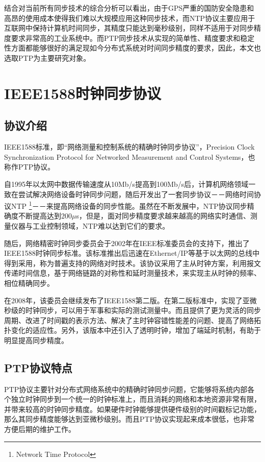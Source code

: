 结合对当前所有同步技术的综合分析可以看出，由于GPS严重的国防安全隐患和高昂的使用成本使得我们难以大规模应用这种同步技术，而NTP协议主要应用于互联网中保持计算机时间同步，其精度只能达到毫秒级别，同样不适用于对同步精度要求非常高的工业系统中。而PTP同步技术从实现的简单性、精度要求和稳定性方面都能够很好的满足现如今分布式系统对时间同步精度的要求，因此，本文也选取PTP为主要研究对象。


\section{IEEE1588时钟同步协议}

\subsection{协议介绍}
\label{sec:1588_intro}
IEEE1588标准，即“网络测量和控制系统的精确时钟同步协议”，Precision Clock Synchronization Protocol for Networked Measurement and Control Systems，也称作PTP协议。

自1995年以太网中数据传输速度从10Mb/s提高到100Mb/s后，计算机网络领域一致在尝试解决网络设备时钟同步问题，随后开发出了一套同步协议－－网络时间协议NTP \footnote{Network Time Protocol}－－来提高网络设备的同步性能。虽然在不断发展中，NTP协议同步精确度不断提高达到200$\mu$s，但是，面对同步精度要求越来越高的网络实时通信、测量仪器与工业控制领域，NTP难以达到它们的要求。

随后，网络精密时钟同步委员会于2002年在IEEE标准委员会的支持下，推出了IEEE1588时钟同步标准。该标准推出后迅速在Ethernet/IP等基于以太网的总线中得到采用，称为普遍支持的网络对时技术。该协议采用了主从时钟方案，利用报文传递时间信息，基于网络链路的对称性和延时测量技术，来实现主从时钟的频率、相位精确同步。

在2008年，该委员会继续发布了IEEE1588第二版。在第二版标准中，实现了亚微秒级的时钟同步，可以用于军事和实际的测试测量中。而且提供了更为灵活的同步周期、改进了时间戳的表示方法、解决了主时钟容错性能差的问题、提高了网络拓扑变化的适应性。另外，该版本中还引入了透明时钟，增加了端延时机制，有助于明显提高同步精度。

\subsection{PTP协议特点}
\label{sec:1588_features}
PTP协议主要针对分布式网络系统中的精确时钟同步问题，它能够将系统内部各个独立时钟同步到一个统一的时钟标准上，而且消耗的网络和本地资源非常有限，并带来较高的时钟同步精度。如果硬件时钟能够提供硬件级别的时间戳标记功能，那么其同步精度能够达到亚微秒级别。而且PTP协议实现起来成本很低，也非常方便后期的维护工作。

